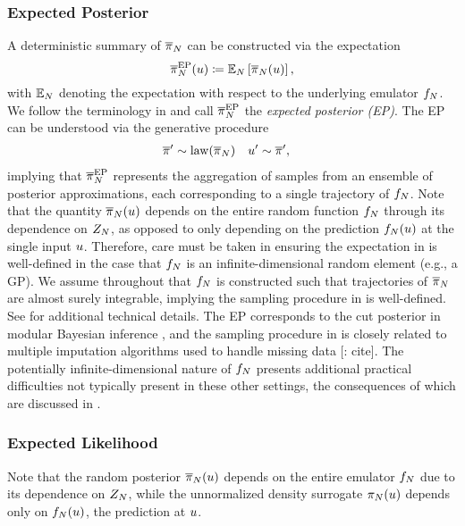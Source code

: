 \documentclass[12pt]{article}
\begin{document}
\subsubsection{Expected Posterior}
A deterministic summary of $\overline{\pi}_{N}$ can be constructed via the expectation 
\begin{equation}
\overline{\pi}_{N}^{\mathrm{EP}}(u) \coloneqq \mathbb{E}_{N}\left[\overline{\pi}_{N}(u) \right], \label{eq:ep-approx}
\end{equation}
with $\mathbb{E}_{N}$ denoting the expectation with respect to the underlying emulator $f_{N}$.
We follow the terminology in \citet{BurknerSurrogate} and call $\overline{\pi}_{N}^{\mathrm{EP}}$ the 
\textit{expected posterior (EP)}. The EP can be understood via the generative procedure
\begin{align}
&\overline{\pi}^\prime \sim \mathrm{law}(\overline{\pi}_{N}) 
&&u^\prime \sim \overline{\pi}^\prime, \label{eq:ep-direct-sample}
\end{align}
implying that $\overline{\pi}_{N}^{\mathrm{EP}}$ represents the aggregation of samples from an ensemble of 
posterior approximations, each corresponding to a single trajectory of $f_{N}$.
Note that the quantity $\overline{\pi}_{N}(u)$ depends on the entire random function $f_{N}$ 
through its dependence on $Z_{N}$, as opposed to only depending on the prediction 
$f_{N}(u)$ at the single input $u$. Therefore, care must be taken in ensuring the 
expectation in  is well-defined in the case that $f_{N}$ is an infinite-dimensional
random element (e.g., a GP). We assume throughout that $f_{N}$ is constructed such that 
trajectories of $\overline{\pi}_{N}$ are almost surely integrable, implying the sampling procedure
in  is well-defined. See 
\citet{StuartTeck1,StuartTeck2,random_fwd_models,garegnani2021NoisyMCMC} for additional
technical details. The EP corresponds to the cut posterior in modular Bayesian inference
\citep{PlummerCut}, and the sampling procedure in  is closely 
related to multiple imputation algorithms used to handle missing data [\todo: cite]. The 
potentially infinite-dimensional nature of $f_{N}$ presents additional practical difficulties
not typically present in these other settings, the consequences of which are 
discussed in .

\subsubsection{Expected Likelihood}
Note that the random posterior $\overline{\pi}_{N}(u)$ depends on the entire 
emulator $f_{N}$ due to its dependence on $Z_{N}$, while the unnormalized 
density surrogate $\pi_{N}(u)$ depends only on $f_{N}(u)$, the prediction at $u$.
\end{document}
